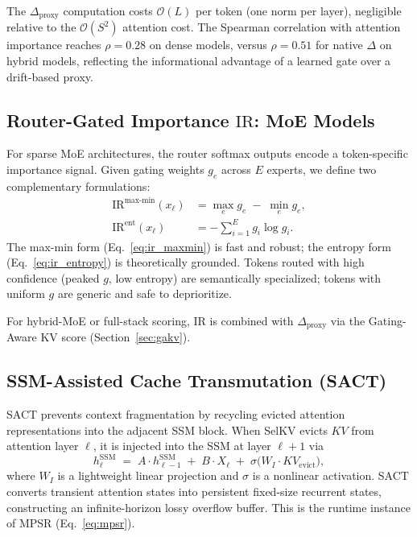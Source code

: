 \documentclass[11pt]{article}
\newcommand{\dsig}{\Delta}
\newcommand{\ir}{\mathrm{IR}}
\newcommand{\proxydsig}{\ensuremath{\dsig_{\mathrm{proxy}}}}
\newcommand{\Order}{\mathcal{O}}
\begin{document}
The $\proxydsig$ computation costs $\Order(L)$ per token (one norm per
layer), negligible relative to the $\Order(S^2)$ attention cost. The Spearman
correlation with attention importance reaches $\rho{=}0.28$ on dense models,
versus $\rho{=}0.51$ for native $\dsig$ on hybrid models, reflecting the
informational advantage of a learned gate over a drift-based proxy.

\subsection{Router-Gated Importance $\ir$: MoE Models}
For sparse MoE architectures, the router softmax outputs encode a
token-specific importance signal. Given gating weights $g_e$ across $E$
experts, we define two complementary formulations:
\begin{align}
  \ir^{\mathrm{max\text{-}min}}(x_\ell) &= \max_e g_e \;-\; \min_e g_e, \label{eq:ir_maxmin} \\
  \ir^{\mathrm{ent}}(x_\ell)            &= -\sum_{i=1}^{E} g_i \log g_i. \label{eq:ir_entropy}
\end{align}
The max-min form (Eq.~\ref{eq:ir_maxmin}) is fast and robust; the entropy
form (Eq.~\ref{eq:ir_entropy}) is theoretically grounded. Tokens routed with
high confidence (peaked $g$, low entropy) are semantically specialized;
tokens with uniform $g$ are generic and safe to deprioritize.

For hybrid-MoE or full-stack scoring, $\ir$ is combined with $\proxydsig$
via the Gating-Aware KV score (Section~\ref{sec:gakv}).

\subsection{SSM-Assisted Cache Transmutation (SACT)}
SACT prevents context fragmentation by recycling evicted attention
representations into the adjacent SSM block. When SelKV evicts $KV$ from
attention layer $\ell$, it is injected into the SSM at layer $\ell{+}1$ via
\begin{equation}\label{eq:sact}
  h_{\ell}^{\mathrm{SSM}} \;=\; A \cdot h_{\ell-1}^{\mathrm{SSM}} \;+\; B \cdot X_\ell \;+\; \sigma\bigl(W_{I} \cdot KV_{\mathrm{evict}}\bigr),
\end{equation}
where $W_I$ is a lightweight linear projection and $\sigma$ is a nonlinear
activation. SACT converts transient attention states into persistent
fixed-size recurrent states, constructing an infinite-horizon lossy overflow
buffer. This is the runtime instance of MPSR (Eq.~\ref{eq:mpsr}).
\end{document}
